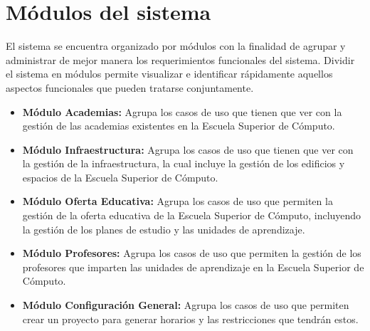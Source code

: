 
\section{Módulos del sistema}

    El sistema se encuentra organizado por módulos con la finalidad de agrupar y administrar de mejor manera los requerimientos funcionales del sistema. Dividir el sistema en módulos permite visualizar e identificar rápidamente aquellos aspectos funcionales que pueden tratarse conjuntamente. \\
%


    \begin{itemize}
    \item {\bf Módulo Academias:} Agrupa los casos de uso que tienen que ver con la gestión de las academias existentes en la Escuela Superior de Cómputo.
	
	\item {\bf Módulo Infraestructura:} Agrupa los casos de uso que tienen que ver con la gestión de la infraestructura, la cual incluye la gestión de los edificios y espacios de la Escuela Superior de Cómputo.

	\item {\bf Módulo Oferta Educativa:} Agrupa los casos de uso que permiten la gestión de la oferta educativa de la Escuela Superior de Cómputo, incluyendo la gestión de los planes de estudio y las unidades de aprendizaje.
    
	\item {\bf Módulo Profesores:} Agrupa los casos de uso que permiten la gestión de los profesores que imparten las unidades de aprendizaje en la Escuela Superior de Cómputo.	

	\item {\bf Módulo Configuración General:} Agrupa los casos de uso que permiten crear un proyecto para generar horarios y las restricciones que tendrán estos. 
	
	\end{itemize}

